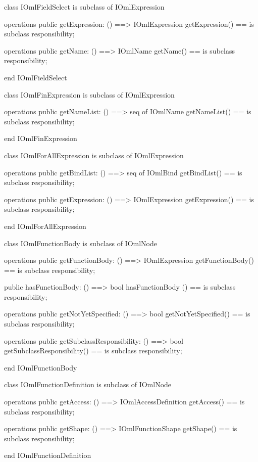 \begin{vdm_al}
class IOmlFieldSelect
 is subclass of IOmlExpression

operations
  public getExpression: () ==> IOmlExpression
  getExpression() == is subclass responsibility;

operations
  public getName: () ==> IOmlName
  getName() == is subclass responsibility;

end IOmlFieldSelect
\end{vdm_al}

\begin{vdm_al}
class IOmlFinExpression
 is subclass of IOmlExpression

operations
  public getNameList: () ==> seq of IOmlName
  getNameList() == is subclass responsibility;

end IOmlFinExpression
\end{vdm_al}

\begin{vdm_al}
class IOmlForAllExpression
 is subclass of IOmlExpression

operations
  public getBindList: () ==> seq of IOmlBind
  getBindList() == is subclass responsibility;

operations
  public getExpression: () ==> IOmlExpression
  getExpression() == is subclass responsibility;

end IOmlForAllExpression
\end{vdm_al}

\begin{vdm_al}
class IOmlFunctionBody
 is subclass of IOmlNode

operations
  public getFunctionBody: () ==> IOmlExpression
  getFunctionBody() == is subclass responsibility;

  public hasFunctionBody: () ==> bool
  hasFunctionBody () == is subclass responsibility;

operations
  public getNotYetSpecified: () ==> bool
  getNotYetSpecified() == is subclass responsibility;

operations
  public getSubclassResponsibility: () ==> bool
  getSubclassResponsibility() == is subclass responsibility;

end IOmlFunctionBody
\end{vdm_al}

\begin{vdm_al}
class IOmlFunctionDefinition
 is subclass of IOmlNode

operations
  public getAccess: () ==> IOmlAccessDefinition
  getAccess() == is subclass responsibility;

operations
  public getShape: () ==> IOmlFunctionShape
  getShape() == is subclass responsibility;

end IOmlFunctionDefinition
\end{vdm_al}


